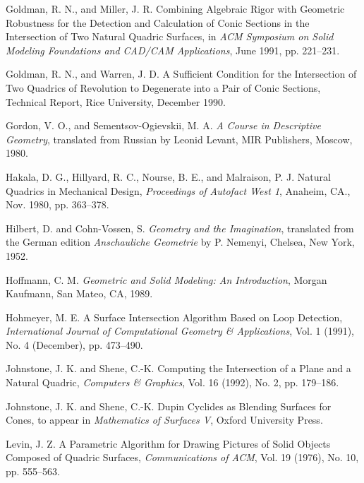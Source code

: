 \begin{thebibliography}{999}
     Goldman, R. N., and Miller, J. R.
     Combining Algebraic Rigor with Geometric Robustness for the Detection
          and Calculation of Conic Sections in the Intersection of Two
          Natural Quadric Surfaces,
     in {\em ACM Symposium on Solid Modeling Foundations and
          CAD/CAM Applications},
     June 1991, pp. 221--231.

     Goldman, R. N., and Warren, J. D.
     A Sufficient Condition for the Intersection of Two Quadrics of Revolution
     to Degenerate into a Pair of Conic Sections,
     Technical Report, Rice University, December 1990.

     Gordon, V. O., and Sementsov-Ogievskii, M. A.
     {\em A Course in Descriptive Geometry},
     translated from Russian by Leonid Levant,
     MIR Publishers, Moscow, 1980.

     Hakala, D. G., Hillyard, R. C., Nourse, B. E., and Malraison, P. J.
     Natural Quadrics in Mechanical Design,
     {\em Proceedings of Autofact West 1},
     Anaheim, CA., Nov. 1980, pp. 363--378.

     Hilbert, D. and Cohn-Vossen, S.
     {\em Geometry and the Imagination},
     translated from the German edition
     {\em Anschauliche Geometrie}
     by P. Nemenyi,
     Chelsea, New York, 1952.

     Hoffmann, C. M.
     {\em Geometric and Solid Modeling: An Introduction},
     Morgan Kaufmann, San Mateo, CA, 1989.

     Hohmeyer, M. E.
     A Surface Intersection Algorithm Based on Loop Detection,
     {\em International Journal of Computational Geometry \& Applications},
     Vol. 1 (1991), No. 4 (December), pp. 473--490.

     Johnstone, J. K. and Shene, C.-K.
     Computing the Intersection of a Plane and a Natural Quadric,
     {\em Computers \& Graphics},
     Vol. 16 (1992), No. 2, pp. 179--186.

     Johnstone, J. K. and Shene, C.-K.
     Dupin Cyclides as Blending Surfaces for Cones,
     to appear in {\em Mathematics of Surfaces V},
     Oxford University Press.

     Levin, J. Z.
     A Parametric Algorithm for Drawing Pictures of Solid Objects Composed
          of Quadric Surfaces,
     {\em Communications of ACM},
     Vol. 19 (1976), No. 10, pp. 555--563.


\end{thebibliography}
